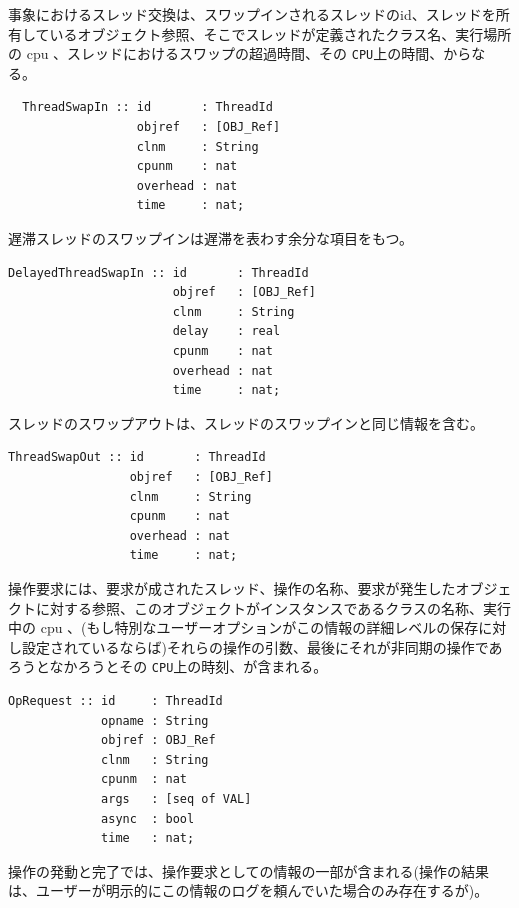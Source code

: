 \documentclass[\pformat,12pt]{jreport}
\begin{document}
事象におけるスレッド交換は、スワップインされるスレッドのid、スレッドを所有しているオブジェクト参照、そこでスレッドが定義されたクラス名、実行場所の cpu 、スレッドにおけるスワップの超過時間、その \texttt{CPU}上の時間、からなる。

\begin{lstlisting}
  ThreadSwapIn :: id       : ThreadId
                  objref   : [OBJ_Ref]
                  clnm     : String
                  cpunm    : nat 
                  overhead : nat
                  time     : nat;
\end{lstlisting}

遅滞スレッドのスワップインは遅滞を表わす余分な項目をもつ。

\begin{lstlisting}
DelayedThreadSwapIn :: id       : ThreadId
                       objref   : [OBJ_Ref]
                       clnm     : String
                       delay    : real
                       cpunm    : nat
                       overhead : nat
                       time     : nat;
\end{lstlisting}

スレッドのスワップアウトは、スレッドのスワップインと同じ情報を含む。

\begin{lstlisting}
ThreadSwapOut :: id       : ThreadId
                 objref   : [OBJ_Ref]
                 clnm     : String
                 cpunm    : nat
                 overhead : nat
                 time     : nat;
\end{lstlisting}

操作要求には、要求が成されたスレッド、操作の名称、要求が発生したオブジェクトに対する参照、このオブジェクトがインスタンスであるクラスの名称、実行中の cpu 、(もし特別なユーザーオプションがこの情報の詳細レベルの保存に対し設定されているならば)それらの操作の引数、最後にそれが非同期の操作であろうとなかろうとその \texttt{CPU}上の時刻、が含まれる。

\begin{lstlisting}
OpRequest :: id     : ThreadId
             opname : String
             objref : OBJ_Ref
             clnm   : String
             cpunm  : nat
             args   : [seq of VAL]
             async  : bool
             time   : nat;
\end{lstlisting}

操作の発動と完了では、操作要求としての情報の一部が含まれる(操作の結果は、ユーザーが明示的にこの情報のログを頼んでいた場合のみ存在するが)。
\end{document}
